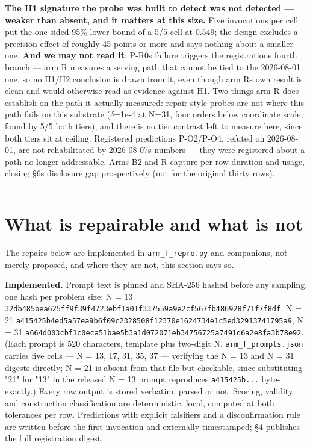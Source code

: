 \textbf{The H1 signature the probe was built to detect was not detected --- weaker than absent, and it matters at this size.} Five invocations per cell put the one-sided 95\% lower bound of a 5/5 cell at 0.549; the design excludes a precision effect of roughly 45 points or more and says nothing about a smaller one. \textbf{And we may not read it}: P-R0\textquotesingle s failure triggers the registration\textquotesingle s fourth branch --- arm R measures a serving path that cannot be tied to the 2026-08-01 one, so no H1/H2 conclusion is drawn from it, even though arm R\textquotesingle s own result is clean and would otherwise read as evidence against H1. Two things arm R does establish on the path it actually measured: repair-style probes are not where this path fails on this substrate (\(\delta\)=1e-4 at N=31, four orders below coordinate scale, found by 5/5 both tiers), and there is no tier contrast left to measure here, since both tiers sit at ceiling. Registered predictions P-O2/P-O4, refuted on 2026-08-01, are not rehabilitated by 2026-08-07\textquotesingle s numbers --- they were registered about a path no longer addressable. Arms B2 and R capture per-row duration and usage, closing §6\textquotesingle s disclosure gap prospectively (not for the original thirty rows).

\begin{center}\rule{0.5\linewidth}{0.5pt}\end{center}

\hypertarget{what-is-repairable-and-what-is-not}{%
\section{What is repairable and what is not}\label{what-is-repairable-and-what-is-not}}

The repairs below are implemented in \texttt{arm\_f\_repro.py} and companions, not merely proposed, and where they are not, this section says so.

\textbf{Implemented.} Prompt text is pinned and SHA-256 hashed before any sampling, one hash per problem size: N = 13 \texttt{32db485bea625ff9f39f4723ebf1a01f337559a9e2cf567fb486928f71f7f8df}, N = 21 \texttt{a415425b4ed5a57ea9b6f09c2328508f12370e1624734e1c5ed32913741795a9}, N = 31 \texttt{a664d003cbf1c0eca51bae5b3a1d072071eb34756725a7491d6a2e8fa3b78e92}. (Each prompt is 520 characters, template plus two-digit N. \texttt{arm\_f\_prompts.json} carries five cells --- N = 13, 17, 31, 35, 37 --- verifying the N = 13 and N = 31 digests directly; N = 21 is absent from that file but checkable, since substituting "21" for "13" in the released N = 13 prompt reproduces \texttt{a415425b...} byte-exactly.) Every raw output is stored verbatim, parsed or not. Scoring, validity and construction classification are deterministic, local, computed at both tolerances per row. Predictions with explicit falsifiers and a disconfirmation rule are written before the first invocation and externally timestamped; §4 publishes the full registration digest.

